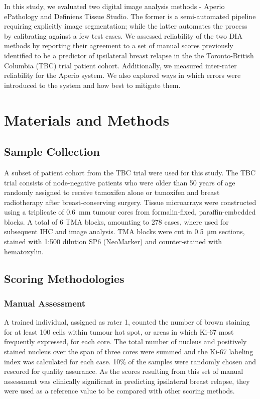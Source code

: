 \documentclass[final,3p,times]{elsarticle}
\begin{document}
In this study, we evaluated two digital image analysis methods - Aperio ePathology and Definiens Tissue Studio. The former is a semi-automated pipeline requiring explicitly image segmentation; while the latter automates the process by calibrating against a few test cases. We assessed reliability of the two DIA methods by reporting their agreement to a set of manual scores previously identified to be a predictor of ipsilateral breast relapse in the the Toronto-British Columbia (TBC) trial patient cohort. \cite{Liu2015}  Additionally, we measured inter-rater reliability for the Aperio system. We also explored ways in which errors were introduced to the system and how best to mitigate them.

\section*{Materials and Methods}

\subsection*{Sample Collection}
A subset of patient cohort from the TBC trial were used for this study. \cite{Liu2015} The TBC trial consists of node-negative patients who were older than 50 years of age randomly assigned to receive tamoxifen alone or tamoxifen and breast radiotherapy after breast-conserving surgery. \cite{Fyles2009} Tissue microarrays were constructed using a triplicate of \SI{0.6}{\milli\metre} tumour cores from formalin-fixed, paraffin-embedded blocks. A total of 6 TMA blocks, amounting to 278 cases, where used for subsequent IHC and image analysis. TMA blocks were cut in \SI{0.5}{\micro\metre} sections, stained with 1:500 dilution SP6 (NeoMarker) and counter-stained with hematoxylin.

\subsection*{Scoring Methodologies}

\subsubsection*{Manual Assessment}
A trained individual, assigned as rater 1, counted the number of brown staining for at least 100 cells within tumour hot spot, or areas in which Ki-67 most frequently expressed, for each core. The total number of nucleus and positively stained nucleus over the span of three cores were summed and the Ki-67 labeling index was calculated for each case. 10\% of the samples were randomly chosen and rescored for quality assurance. As the scores resulting from this set of manual assessment was clinically significant in predicting ipsilateral breast relapse, they were used as a reference value to be compared with other scoring methods.
\end{document}
